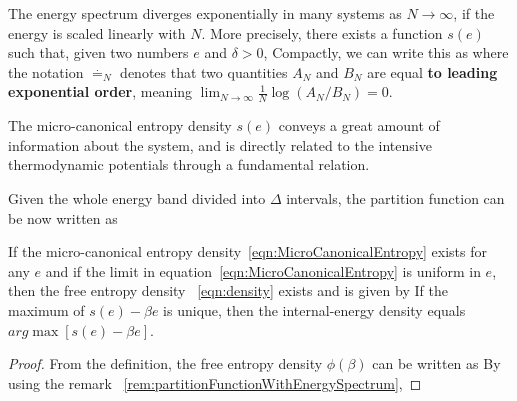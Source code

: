 \documentclass[letterpaper,english,10pt]{article}
\begin{document}
The energy spectrum diverges exponentially in many systems as $N \to \infty$, if the energy is scaled linearly with $N$. 
More precisely, there exists a function $s(e)$ such that, given two numbers $e$ and $\delta > 0$, 
Compactly, we can write this as 
where the notation $\stackrel{.}{=}_N$ denotes that two quantities $A_N$ and $B_N$ are equal \textbf{to leading exponential order}, meaning $\lim_{N \to \infty} \frac{1}{N} \log (A_N/B_N)=0$.

The micro-canonical entropy density $s(e)$ conveys a great amount of information about the system, and is directly related to the intensive thermodynamic
potentials through a fundamental relation.

\begin{rem}
\label{rem:partitionFunctionWithEnergySpectrum}
Given the whole energy band divided into $\Delta$ intervals, the partition function can be now written as 

\end{rem}


\begin{prop}
If the micro-canonical entropy density~\eqref{eqn:MicroCanonicalEntropy} exists for any $e$ and if the limit in equation~\eqref{eqn:MicroCanonicalEntropy} is uniform in $e$, then the free entropy density ~\eqref{eqn:density} exists and is given by
If the maximum of $s(e)-\beta e$ is unique, then the internal-energy density equals $arg\max[s(e)-\beta e]$.
\end{prop}

\begin{proof}
From the definition, the free entropy density $\phi(\beta)$ can be written as
By using the remark ~\ref{rem:partitionFunctionWithEnergySpectrum},
\end{proof}
\end{document}
